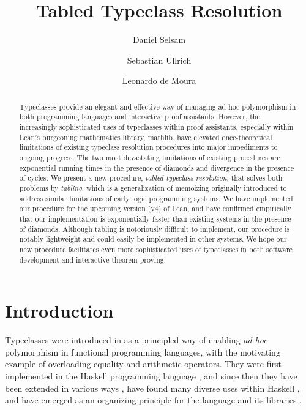 \documentclass[runningheads]{llncs}
\begin{document}
%
\title{Tabled Typeclass Resolution}
%
%
\author{Daniel Selsam \and Sebastian Ullrich \and Leonardo de Moura}
%
%
%
\maketitle              %
%
\begin{abstract}
Typeclasses provide an elegant and effective way of managing ad-hoc polymorphism
in both programming languages and interactive proof assistants.
However, the increasingly sophisticated uses of typeclasses within proof assistants,
especially within Lean's burgeoning mathematics library, \textsf{mathlib},
have elevated once-theoretical limitations of existing typeclass resolution procedures
into major impediments to ongoing progress.
The two most devastating limitations of existing procedures are exponential running times in the presence of diamonds and divergence in the presence of cycles.
We present a new procedure, \emph{tabled typeclass resolution}, that solves both problems by \emph{tabling},
which is a generalization of memoizing originally introduced to address similar limitations of early logic programming systems.
We have implemented our procedure for the upcoming version (v4) of Lean,
and have confirmed empirically that our implementation is exponentially faster than existing systems in the presence of diamonds.
Although tabling is notoriously difficult to implement,
our procedure is notably lightweight and could easily be implemented in other systems.
We hope our new procedure facilitates even more sophisticated uses of typeclasses in both software development and interactive theorem proving.
\end{abstract}

\section{Introduction}\label{sec:intro}

Typeclasses were introduced in \cite{wadler1989make} as a principled way of enabling \emph{ad-hoc} polymorphism
in functional programming languages,
with the motivating example of overloading equality and arithmetic operators.
They were first implemented in the Haskell programming language \cite{hall1996type},
and since then they have been extended in various ways \cite{chen1992parametric,laufer1996type,jones1997type,jones2000type,kahl2001named,duggan2002type},
have found many diverse uses within Haskell \cite{jones1992computing,gill2000debugging,hinze2001derivable,mcbride2002faking,kiselyov2004strongly,lammel2005scrap,lammel2006software,li2006encoding,pucella2008haskell,keller2010regular,claessen2011quickcheck},
and have emerged as an organizing principle for the language and its libraries \cite{jones2003haskell}.
\end{document}
